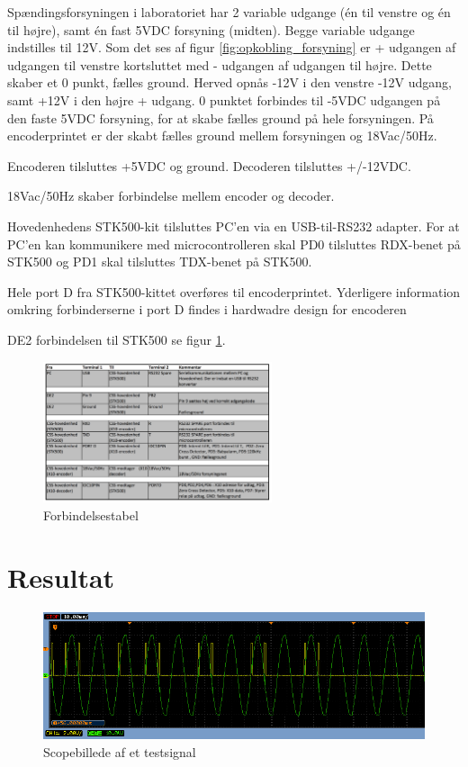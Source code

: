 Spændingsforsyningen i laboratoriet har 2 variable udgange (én til venstre og én til højre), samt én fast 5VDC forsyning (midten). Begge variable udgange indstilles til 12V. 
Som det ses af figur \ref{fig:opkobling_forsyning} er + udgangen af udgangen til venstre kortsluttet med - udgangen af udgangen til højre. Dette skaber et 0 punkt, fælles ground. Herved opnås -12V i den venstre -12V udgang, samt +12V i den højre + udgang. 0 punktet forbindes til -5VDC udgangen på den faste 5VDC forsyning, for at skabe fælles ground på hele forsyningen. På encoderprintet er der skabt fælles ground mellem forsyningen og 18Vac/50Hz.

Encoderen tilsluttes +5VDC og ground.
Decoderen tilsluttes +/-12VDC.

18Vac/50Hz skaber forbindelse mellem encoder og decoder.

Hovedenhedens STK500-kit tilsluttes PC'en via en USB-til-RS232 adapter. For at PC'en kan kommunikere med microcontrolleren skal PD0 tilsluttes RDX-benet på STK500 og PD1 skal tilsluttes TDX-benet på STK500. 

Hele port D fra STK500-kittet overføres til encoderprintet. Yderligere information omkring forbinderserne i port D findes i hardwadre design for encoderen

DE2 forbindelsen til STK500 se figur \ref{fig:integration_tabel}.

\begin{figure}[H]
	\centering
	\includegraphics[width=0.6\textwidth]{billeder/IntTest/Integration_tabel}
	\caption{Forbindelsestabel}
	\label{fig:integration_tabel}
\end{figure}

\section{Resultat}

\begin{figure}[H]
	\centering
	\includegraphics[width=\textwidth]{billeder/IntTest/Modtager_0101_ON}
	\caption{Scopebillede af et testsignal}
	\label{fig:Modtager_0101_ON}
\end{figure}

